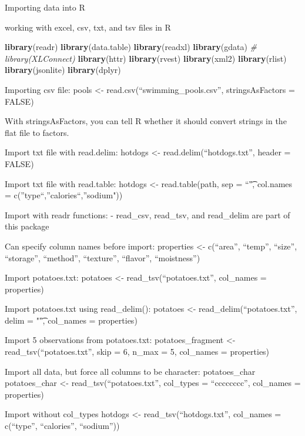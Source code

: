 \documentclass[]{book}
\newenvironment{Shaded}{\begin{snugshade}}{\end{snugshade}}
\newcommand{\CommentTok}[1]{\textcolor[rgb]{0.56,0.35,0.01}{\textit{#1}}}
\newcommand{\KeywordTok}[1]{\textcolor[rgb]{0.13,0.29,0.53}{\textbf{#1}}}
\newcommand{\NormalTok}[1]{#1}
\begin{document}
Importing data into R

working with excel, csv, txt, and tsv files in R

\begin{Shaded}
\begin{Highlighting}[]
\KeywordTok{library}\NormalTok{(readr) }
\KeywordTok{library}\NormalTok{(data.table)}
\KeywordTok{library}\NormalTok{(readxl)}
\KeywordTok{library}\NormalTok{(gdata)}
\CommentTok{# library(XLConnect)}
\KeywordTok{library}\NormalTok{(httr)}
\KeywordTok{library}\NormalTok{(rvest)}
\KeywordTok{library}\NormalTok{(xml2)}
\KeywordTok{library}\NormalTok{(rlist)}
\KeywordTok{library}\NormalTok{(jsonlite)}
\KeywordTok{library}\NormalTok{(dplyr)}
\end{Highlighting}
\end{Shaded}

Importing csv file:
pools \textless{}- read.csv(``swimming\_pools.csv'', stringsAsFactors = FALSE)

With stringsAsFactors, you can tell R whether it should convert strings in the flat file to factors.

Import txt file with read.delim:
hotdogs \textless{}- read.delim(``hotdogs.txt'', header = FALSE)

Import txt file with read.table:
hotdogs \textless{}- read.table(path,
sep = ``\t",
col.names = c(''type``,''calories``,''sodium"))

Import with readr functions:
- read\_csv, read\_tsv, and read\_delim are part of this package

Can specify column names before import:
properties \textless{}- c(``area'', ``temp'', ``size'', ``storage'', ``method'',
``texture'', ``flavor'', ``moistness'')

Import potatoes.txt:
potatoes \textless{}- read\_tsv(``potatoes.txt'', col\_names = properties)

Import potatoes.txt using read\_delim():
potatoes \textless{}- read\_delim(``potatoes.txt'', delim = "\t", col\_names = properties)

Import 5 observations from potatoes.txt:
potatoes\_fragment \textless{}- read\_tsv(``potatoes.txt'', skip = 6, n\_max = 5, col\_names = properties)

Import all data, but force all columns to be character: potatoes\_char
potatoes\_char \textless{}- read\_tsv(``potatoes.txt'', col\_types = ``cccccccc'', col\_names = properties)

Import without col\_types
hotdogs \textless{}- read\_tsv(``hotdogs.txt'', col\_names = c(``type'', ``calories'', ``sodium''))
\end{document}
